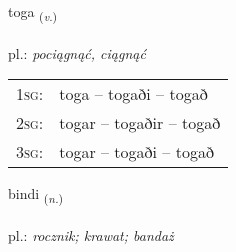 \documentclass[frontgrid, backgrid]{flacards}\usepackage[]{graphicx}\usepackage[]{xcolor}
\begin{document}
\renewcommand{\flhead}{\vskip5pt \fboxsep=0pt {\small\bfseries\footnotesize Sagnorð | czasownik}}
\renewcommand{\fcfoot}{\vskip5pt \fboxsep=0pt \hspace{2pt}{\small\bfseries\footnotesize 3K}}

\renewcommand{\blhead}{\vskip5pt {\small\bfseries\footnotesize Sagnorð | czasownik }}
\renewcommand{\bcfoot}{\vskip5pt \hspace{2pt}{\small\bfseries\footnotesize 3K}}


{toga \small{\textsubscript{(\textit{v.})}} \\[1ex] %
\textphonetic{[tʰɔːɣa]} \\
pl.: \emph{pociągnąć, ciągnąć} \\  [2ex]
\renewcommand*{\arraystretch}{0.8}
\begin{tabular}{p{1cm}l}
\textsc{1sg}: & toga -- togaði -- togað \\ 
\textsc{2sg}: & togar -- togaðir -- togað \\ 
\textsc{3sg}: & togar -- togaði -- togað \\ 
\end{tabular}
}

\renewcommand{\flhead}{\vskip5pt \fboxsep=0pt {\small\bfseries\footnotesize Nafnorð | rzeczownik}}
\renewcommand{\fcfoot}{\vskip5pt \fboxsep=0pt \hspace{2pt}{\small\bfseries\footnotesize 3K}}

\renewcommand{\blhead}{\vskip5pt {\small\bfseries\footnotesize Nafnorð | rzeczownik }}
\renewcommand{\bcfoot}{\vskip5pt \hspace{2pt}{\small\bfseries\footnotesize 3K}}


{bindi \small{\textsubscript{(\textit{n.})}} \\[1ex] %
\textphonetic{[pɪntɪ]} \\
pl.: \emph{rocznik; krawat; bandaż} \\  [2ex]
\renewcommand*{\arraystretch}{0.8}
}
\end{document}

